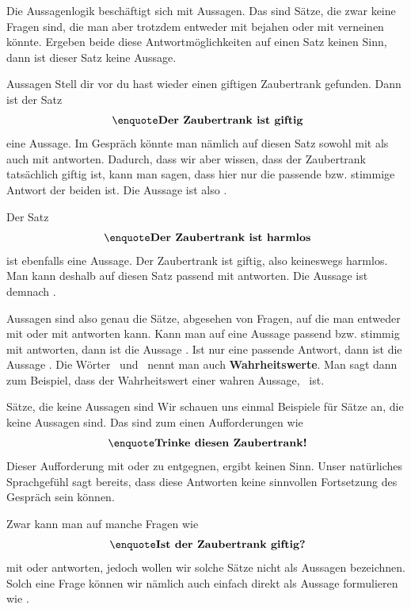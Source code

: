 \documentclass[../../main.tex]{subfiles}
\begin{document}
    Die Aussagenlogik beschäftigt sich mit Aussagen. Das sind Sätze, die zwar 
    keine Fragen sind, die man aber trotzdem entweder 
    mit   bejahen oder mit 
      verneinen könnte. Ergeben beide diese 
    Antwortmöglichkeiten auf einen Satz keinen Sinn, dann ist dieser Satz keine 
    Aussage.
    \begin{example}{Aussagen}
        Stell dir vor du hast wieder einen giftigen Zaubertrank gefunden. Dann ist der Satz
        \[\textrm{ \statement{Der Zaubertrank ist giftig}}\]
        eine Aussage.
        Im Gespräch könnte man nämlich auf diesen Satz sowohl mit   als auch mit   antworten. 
        Dadurch, dass wir aber wissen, dass der Zaubertrank tatsächlich giftig ist, kann man sagen, dass hier nur   die passende bzw. stimmige 
        Antwort der beiden ist. Die Aussage ist also \wahr.
        
        Der Satz
        \[\textrm{ \statement{Der Zaubertrank ist harmlos}}\]
        ist ebenfalls eine Aussage. Der Zaubertrank ist giftig, also keineswegs harmlos. Man kann deshalb auf diesen Satz passend mit   antworten. 
        Die Aussage ist demnach \falsch.
    \end{example}
    
    Aussagen sind also genau die Sätze, abgesehen von Fragen, auf die man entweder 
    mit   oder mit   antworten kann. Kann man auf eine Aussage passend bzw. stimmig 
    mit   antworten, dann ist die Aussage 
    \wahr. Ist nur   eine passende 
    Antwort, dann ist die Aussage \falsch. Die Wörter \falsch\  und \wahr\  nennt
    man auch \textbf{Wahrheitswerte}. Man sagt dann zum Beispiel, dass der Wahrheitswert einer wahren
    Aussage, \wahr\  ist.

    \begin{example}{Sätze, die keine Aussagen sind}
        Wir schauen uns einmal Beispiele für Sätze an, die keine Aussagen sind. Das sind zum einen Aufforderungen wie
        \[\textrm{ \statement{Trinke diesen Zaubertrank!}}\]
        Dieser Aufforderung mit   oder   zu entgegnen, ergibt keinen Sinn. Unser natürliches Sprachgefühl sagt bereits, dass diese Antworten keine sinnvollen Fortsetzung des Gespräch sein können.
        
        Zwar kann man auf manche Fragen wie
         \[\textrm{ \statement{Ist der Zaubertrank giftig?}}\]
        mit   oder   antworten, jedoch wollen wir solche Sätze nicht als Aussagen bezeichnen. Solch eine Frage können wir nämlich auch einfach direkt als Aussage formulieren wie
         .
    \end{example}
\end{document}
